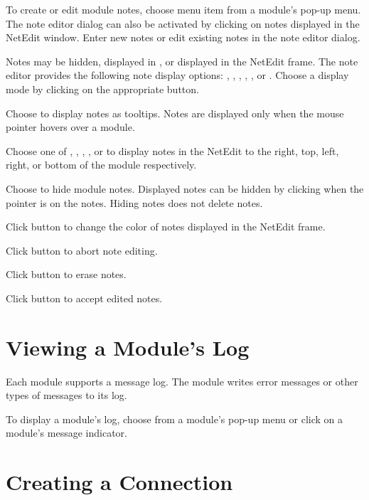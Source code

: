 To create or edit module notes, choose menu item 
from a module's pop-up menu. The note editor dialog can also be
activated by clicking  on notes displayed in the
NetEdit window.  Enter new notes or edit existing notes in the note
editor dialog.

Notes may be hidden, displayed in , or displayed in the
NetEdit frame.  The note editor provides the following note display
options: , , ,
, , or .  Choose a
display mode by clicking  on the appropriate button.

Choose  to display notes as tooltips.  Notes are
displayed only when the mouse pointer hovers over a module.

Choose one of , , ,
, or  to display notes in the
NetEdit to the right, top, left, right, or bottom of the module
respectively. 

Choose  to hide module notes.  Displayed notes can be
hidden by clicking  when the pointer is on the
notes.  Hiding notes does not delete notes.

Click button  to change the color of notes
displayed in the NetEdit frame.

Click button  to abort note editing.

Click button  to erase notes.

Click button  to accept edited notes.


\section{Viewing a Module's Log}
\label{sec:viewmodslog}

Each module supports a message log. The module writes error messages
or other types of messages to its log.

To display a module's log, choose  from a module's
pop-up menu or click  on a module's message indicator.


\section{Creating a Connection}
\label{sec:connectmods}

